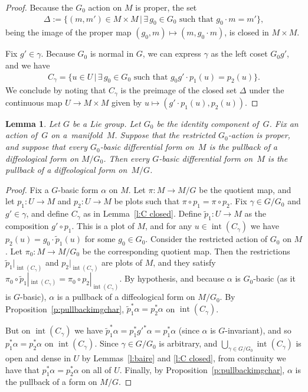 \documentclass[11pt]{article}
\numberwithin{equation}{section}
\newtheorem{Lemma}[Theorem]{Lemma}
\newcommand{\inter}{{\operatorname{int}}} %
\newcommand{\hypref}[2]{{#2~\ref{#1}}}
\begin{document}
\begin{proof}
Because the $G_0$ action on $M$ is proper, the set
\begin{gather*}
\Delta := \{ (m,m') \in M \times M \, | \,
\exists\, g_0 \in G_0 \text{ such that } g_0 \cdot m = m' \},
\end{gather*}
being the image of the proper map $(g_0,m) \mapsto (m,g_0 \cdot m)$,
is closed in $M \times M$.

Fix $g' \in \gamma$. Because $G_0$ is normal in $G$,
we can express $\gamma$ as the left coset $G_0 g'$, and we have
\begin{gather*} C_\gamma = \{ u \in U \, | \, \exists\, g_0 \in G_0 \text{ such that }
g_0 g' \cdot p_1(u) = p_2(u) \} .\end{gather*}
We conclude by noting that $C_\gamma$ is the preimage of the closed set $\Delta$
under the continuous map $U \to M \times M$
given by $u \mapsto ( g' \cdot p_1(u) , p_2(u) )$.
\end{proof}

\begin{Lemma} \label{l:conntodisc}
Let $G$ be a Lie group. Let $G_0$ be the identity component of~$G$.
Fix an action of~$G$ on a~mani\-fold~$M$.
Suppose that the restricted $G_0$-action is proper,
and suppose that every $G_0$-basic differential form on~$M$
is the pullback of a diffeological form on $M/G_0$.
Then every $G$-basic differential form on~$M$
is the pullback of a diffeological form on~$M/G$.
\end{Lemma}

\begin{proof}
Fix a $G$-basic form $\alpha$ on $M$.
Let $\pi \colon M\to M/G$ be the quotient map,
and let $p_1 \colon U\to M$ and $p_2 \colon U\to M$ be plots
such that $\pi\circ p_1=\pi\circ p_2$.
Fix $\gamma\in G/G_0$ and
$g' \in \gamma$, and def\/ine $C_\gamma$
as in \hypref{l:C closed}{Lemma}. Def\/ine $\tilde{p}_1 \colon U \to M$
as the composition
$g' \circ p_1$. This is a plot of $M$,
and for any $u \in \inter(C_\gamma)$ we have
$p_2(u) = g_0 \cdot\tilde{p}_1(u)$ for some $g_0 \in G_0$.
Consider the restricted action of $G_0$ on $M$.
Let $\pi_0 \colon M \to M/G_0$ be the corresponding quotient map.
Then the restrictions $\tilde{p}_1|_{\inter(C_\gamma)}$
and $p_2|_{\inter(C_\gamma)}$ are plots of $M$,
and they satisfy
$\pi_0 \circ \tilde{p}_1|_{\inter(C_\gamma)}
 = \pi_0 \circ p_2|_{\inter(C_\gamma)}$.
By hypothesis, and because $\alpha$ is $G_0$-basic (as it is $G$-basic),
$\alpha$ is a pullback of a dif\/feological form on $M/G_0$.
By \hypref{p:pullbackimgchar}{Proposition},
$\tilde{p}_1^* \alpha = p_2^*\alpha$ on $\inter(C_\gamma)$.

But on $\inter(C_\gamma)$ we have
$\tilde{p}_1^* \alpha = p_1^* {g'}^* \alpha = p_1^* \alpha$
(since $\alpha$ is $G$-invariant),
and so $p_1^* \alpha = p_2^* \alpha$ on $\inter(C_\gamma)$.
Since $\gamma\in G/G_0$ is arbitrary,
and $\bigcup_{\gamma\in G/G_0}\inter(C_\gamma)$ is open and dense in $U$
by Lemmas~\ref{l:baire} and \ref{l:C closed},
%
%
from continuity we have that $p_1^*\alpha=p_2^*\alpha$ on all of $U$.
Finally, by \hypref{p:pullbackimgchar}{Proposition},
$\alpha$ is the pullback of a form on $M/G$.
\end{proof}
\end{document}
